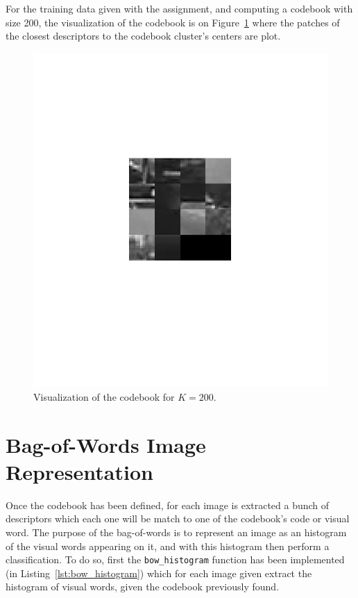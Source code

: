 \documentclass{ethz_report}
\begin{document}


For the training data given with the assignment, and computing a codebook with size 200, the visualization of the codebook is on Figure~\ref{fig:visualize_codebook} where the patches of the closest descriptors to the codebook cluster's centers are plot.

\begin{figure}[h]
    \centering
    \includegraphics[width=1\linewidth]{images/visualize_codebook}
    \caption{Visualization of the codebook for $K=200$.}
    \label{fig:visualize_codebook}
\end{figure}

\section*{Bag-of-Words Image Representation}

Once the codebook has been defined, for each image is extracted a bunch of descriptors which each one will be match to one of the codebook's code or visual word.
The purpose of the bag-of-words is to represent an image as an histogram of the visual words appearing on it, and with this histogram then perform a classification.
To do so, first the \texttt{bow\_histogram} function has been implemented (in Listing~\ref{lst:bow_histogram}) which for each image given extract the histogram of visual words, given the codebook previously found.
\end{document}

